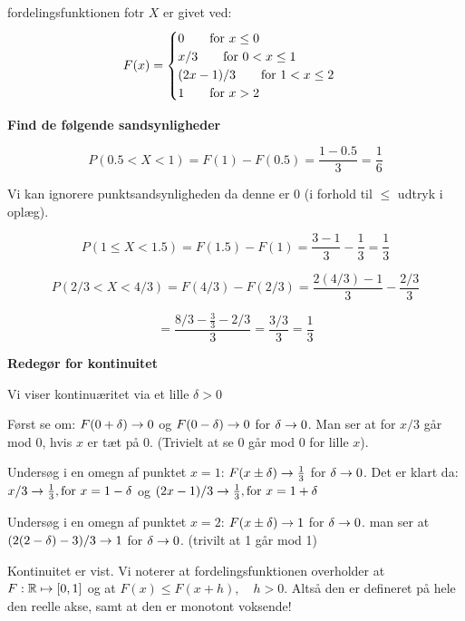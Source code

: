 fordelingsfunktionen fotr $X$ er givet ved:
\[   
F(x)= 
     \begin{cases}
       0\qquad \text{for } x \leq 0\\
       x/3 \qquad \text{for } 0 < x \leq 1 \\
       (2x -1)/3 \qquad \text{for } 1 < x \leq2\\
       1 \qquad \text{for } x> 2 
     \end{cases}
\] 

\textbf{Find de følgende sandsynligheder}

\begin{equation}
    P(0.5 < X < 1) = F(1) - F(0.5) = \frac{1 - 0.5}{3}=  \frac{1}{6}
\end{equation}

Vi kan ignorere punktsandsynligheden da denne er 0 (i forhold til $\leq$ udtryk i oplæg).

\begin{equation}
    P(1 \leq X <  1.5) = F(1.5) - F(1) = \frac{3 - 1 }{3} - \frac{1}{3} = \frac{1}{3}
\end{equation}

\begin{equation}
    P(2/3 < X < 4/3) = F(4/3) - F(2/3) = \frac{2(4/3) - 1}{3} - \frac{2/3}{3} 
\end{equation}

\begin{equation}
   = \frac{8/3 - \frac{3}{3} - 2/3}{3} = \frac{3/3}{3} = \frac{1}{3}
\end{equation}

\textbf{Redegør for kontinuitet}

Vi viser kontinuæritet via et lille $\delta>0$

Først se om: $F(0 + \delta) \rightarrow 0$ og $ F(0 - \delta )\rightarrow 0$ for $\delta \rightarrow 0$. Man ser at for $x/3$ går mod 0, hvis $x$ er tæt på 0. (Trivielt at se 0 går mod 0 for lille $x$).

Undersøg i en omegn af punktet $x=1$: $F(x \pm \delta) \rightarrow \frac{1}{3}$ for $\delta \rightarrow 0$. Det er klart da: $x/3 \rightarrow \frac{1}{3}, \text{for } x = 1 - \delta$ og $(2x - 1)/3 \rightarrow \frac{1}{3}, \text{for } x = 1 + \delta$

Undersøg i en omegn af punktet $x=2$: 
$F(x \pm \delta) \rightarrow 1$ for $\delta \rightarrow 0$. man ser at $(2(2-\delta)  - 3)/3 \rightarrow 1$ for $\delta \rightarrow 0$. (trivilt at 1 går mod 1)

Kontinuitet er vist. Vi noterer at fordelingsfunktionen overholder at $F: \mathbb{R} \mapsto [0,1]$ og at $F(x) \leq F(x + h), \quad h>0$. Altså den er defineret på hele den reelle akse, samt at den er monotont voksende!

